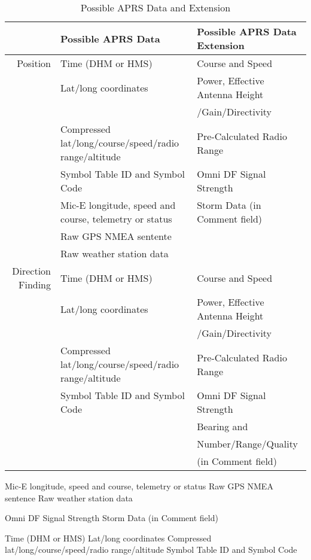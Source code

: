 \begin{table}[htbp]
  \caption{Possible APRS Data and Extension}
  \begin{tabular}{|r|l|l|}
    \hline
    & Possible APRS Data & Possible APRS Data Extension \\
    \hline
    Position & Time (DHM or HMS) & Course and Speed \\
    & Lat/long coordinates & Power, Effective Antenna Height \\
    & & /Gain/Directivity \\
    & Compressed lat/long/course/speed/radio range/altitude & Pre-Calculated Radio Range \\
    & Symbol Table ID and Symbol Code & Omni DF Signal Strength \\
    & Mic-E longitude, speed and course, telemetry or status & Storm Data (in Comment field) \\
    & Raw GPS NMEA sentente & \\
    & Raw weather station data & \\
    \hline
    Direction Finding & Time (DHM or HMS) & Course and Speed \\
    & Lat/long coordinates & Power, Effective Antenna Height \\
    & & /Gain/Directivity \\
    & Compressed lat/long/course/speed/radio range/altitude & Pre-Calculated Radio Range \\
    & Symbol Table ID and Symbol Code & Omni DF Signal Strength \\
    & & Bearing and \\
    & & Number/Range/Quality \\
    & & (in Comment field) \\
    \hline
    
    
    \hline
  \end{tabular}
\end{table}


\clearpage

  



Mic-E longitude, speed and course, telemetry or status
Raw GPS NMEA sentence
Raw weather station data




Omni DF Signal Strength
Storm Data (in Comment field)

Time (DHM or HMS)
Lat/long coordinates
Compressed lat/long/course/speed/radio range/altitude
Symbol Table ID and Symbol Code

